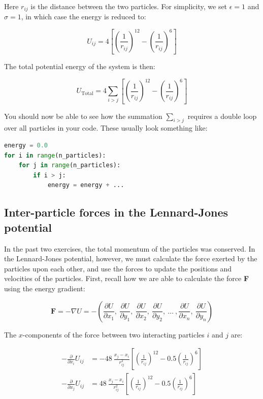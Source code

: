 \documentclass{article}
\begin{document}
Here $r_{ij}$ is the distance between the two particles. For simplicity, we
set $\epsilon = 1$ and $\sigma = 1$, in which case the energy is reduced
to:

\begin{equation}
    U_{ij} = 4 \left[ \left(\frac{1}{r_{ij}} \right)^{12} - \left(\frac{1}{r_{ij}} \right)^6 \right]
\end{equation}

The total potential energy of the system is then:

\begin{equation}
    U_{\mathrm{Total}} = 4 \sum_{i>j} \left[ \left(\frac{1}{r_{ij}} \right)^{12} - \left(\frac{1}{r_{ij}} \right)^6 \right]
\end{equation}

You should now be able to see how the summation $\sum_{i>j}$ requires a double
loop over all particles in your code. These usually look
something like:

\begin{lstlisting}[language=python]
energy = 0.0
for i in range(n_particles):
    for j in range(n_particles):
        if i > j:
            energy = energy + ...
\end{lstlisting}

\subsection{Inter-particle forces in the Lennard-Jones potential}

In the past two exercises, the total momentum of the particles was conserved.
In the Lennard-Jones potential, however, we must calculate the force exerted by
the particles upon each other, and use the forces to update the positions and
velocities of the particles.
First, recall how we are able to calculate the force \textbf{F} using the
energy gradient:

\begin{equation}
    \mathbf{F} = -\nabla U = -\left( \frac{\partial U}{\partial x_1},\ \frac{\partial U}{\partial y_1},\  \frac{\partial U}{\partial x_2},\ \frac{\partial U}{\partial y_2},\ \ldots\ ,\frac{\partial U}{\partial x_n},\ \frac{\partial U}{\partial y_n}\right)
    \label{eq:force}
\end{equation}

The $x$-components of the force between two interacting particles $i$ and $j$
are:

\begin{align}
-\frac{\partial}{\partial x_i} U_{ij} &= -48\ \frac{x_j - x_i}{r^2_{ij}}\left[ \left(\frac{1}{r_{ij}} \right)^{12} - 0.5 \left(\frac{1}{r_{ij}} \right)^6 \right] \\
-\frac{\partial}{\partial x_j} U_{ij} &=  48\ \frac{x_j - x_i}{r^2_{ij}}\left[ \left(\frac{1}{r_{ij}} \right)^{12} - 0.5 \left(\frac{1}{r_{ij}} \right)^6 \right]
\end{align}
\end{document}
